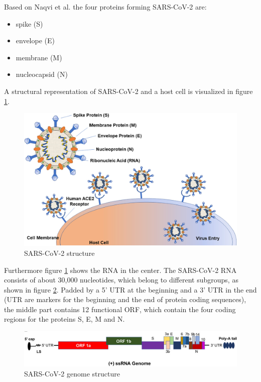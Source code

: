 Based on Naqvi et al. \cite{NAQVI2020165878} the four proteins forming \ac{SARS-CoV-2} are:
\begin{itemize}
	\item spike (S)
	\item envelope (E)
	\item membrane (M)
	\item nucleocapsid (N)
\end{itemize}

A structural representation of \ac{SARS-CoV-2} and a host cell is visualized in figure \ref{sarscov2_structure}. \cite{NAQVI2020165878}

\begin{figure}[ht]
	\centering
	\includegraphics[width=0.8\linewidth]{figures/SARS-CoV-2Structure.jpg}
	\caption{SARS-CoV-2 structure \cite[p. 2]{NAQVI2020165878}}
	\label{sarscov2_structure}
\end{figure}

Furthermore figure \ref{sarscov2_structure} shows the \ac{RNA} in the center. The \ac{SARS-CoV-2} \ac{RNA} consists of about 30,000 nucleotides, which belong to different subgroups, as shown in figure \ref{sarscov2GenomeStructure}. 
Padded by a 5' \ac{UTR} at the beginning and a 3' \ac{UTR} in the end (\ac{UTR} are markers for the beginning and the end of protein coding sequences), the middle part contains 12 functional \ac{ORF}, which contain the four coding regions for the proteins S, E, M and N. 

\begin{figure}[ht]
	\centering
	\includegraphics[width=1.0\linewidth]{figures/sarscov2GenomeStructure.png}
	\caption{\ac{SARS-CoV-2} genome structure \cite[p. 3]{NAQVI2020165878}}
	\label{sarscov2GenomeStructure}
\end{figure}

